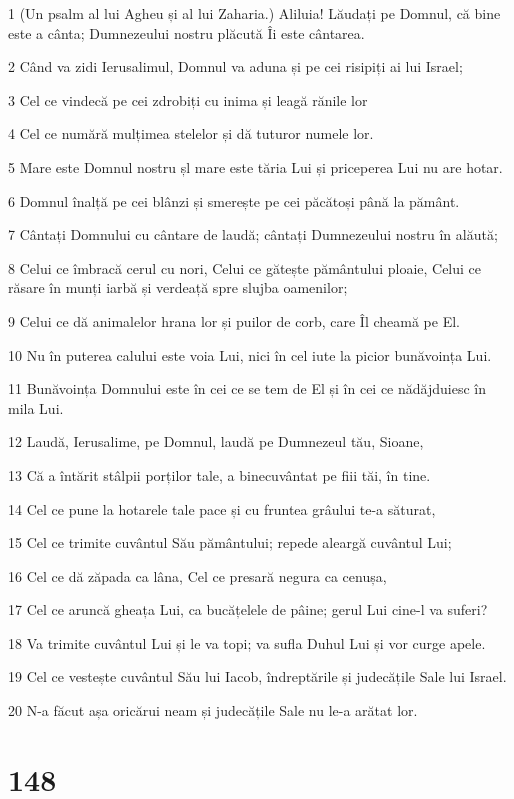 \par 1 (Un psalm al lui Agheu și al lui Zaharia.) Aliluia! Lăudați pe Domnul, că bine este a cânta; Dumnezeului nostru plăcută Îi este cântarea.
\par 2 Când va zidi Ierusalimul, Domnul va aduna și pe cei risipiți ai lui Israel;
\par 3 Cel ce vindecă pe cei zdrobiți cu inima și leagă rănile lor
\par 4 Cel ce numără mulțimea stelelor și dă tuturor numele lor.
\par 5 Mare este Domnul nostru șl mare este tăria Lui și priceperea Lui nu are hotar.
\par 6 Domnul înalță pe cei blânzi și smerește pe cei păcătoși până la pământ.
\par 7 Cântați Domnului cu cântare de laudă; cântați Dumnezeului nostru în alăută;
\par 8 Celui ce îmbracă cerul cu nori, Celui ce gătește pământului ploaie, Celui ce răsare în munți iarbă și verdeață spre slujba oamenilor;
\par 9 Celui ce dă animalelor hrana lor și puilor de corb, care Îl cheamă pe El.
\par 10 Nu în puterea calului este voia Lui, nici în cel iute la picior bunăvoința Lui.
\par 11 Bunăvoința Domnului este în cei ce se tem de El și în cei ce nădăjduiesc în mila Lui.
\par 12 Laudă, Ierusalime, pe Domnul, laudă pe Dumnezeul tău, Sioane,
\par 13 Că a întărit stâlpii porților tale, a binecuvântat pe fiii tăi, în tine.
\par 14 Cel ce pune la hotarele tale pace și cu fruntea grâului te-a săturat,
\par 15 Cel ce trimite cuvântul Său pământului; repede aleargă cuvântul Lui;
\par 16 Cel ce dă zăpada ca lâna, Cel ce presară negura ca cenușa,
\par 17 Cel ce aruncă gheața Lui, ca bucățelele de pâine; gerul Lui cine-l va suferi?
\par 18 Va trimite cuvântul Lui și le va topi; va sufla Duhul Lui și vor curge apele.
\par 19 Cel ce vestește cuvântul Său lui Iacob, îndreptările și judecățile Sale lui Israel.
\par 20 N-a făcut așa oricărui neam și judecățile Sale nu le-a arătat lor.

\chapter{148}

